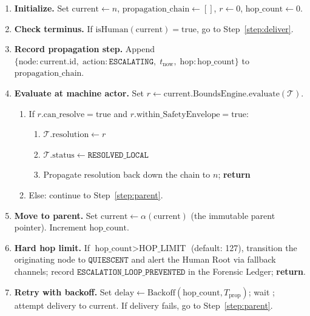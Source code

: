 \bigskip
\begin{algorithm}[H]
\caption{Bailout Protocol Escalation Algorithm (executed at every node)}
\label{alg:bailout-escalation}
\begin{enumerate}
\item \textbf{Initialize.} Set $\text{current} \leftarrow n$,
  $\text{propagation\_chain} \leftarrow []$, $r \leftarrow 0$,
  $\text{hop\_count} \leftarrow 0$.

\item \textbf{Check terminus.} If $\text{isHuman}(\text{current}) = \text{true}$,
  go to Step~\ref{step:deliver}.

\item \textbf{Record propagation step.} Append
  $\{\text{node}: \text{current.id},\; \text{action}: \texttt{ESCALATING},\;
  t_{\text{now}},\; \text{hop}: \text{hop\_count}\}$ to
  $\text{propagation\_chain}$.

\item \textbf{Evaluate at machine actor.} Set
  $r \leftarrow \text{current.BoundsEngine.evaluate}(\mathcal{T})$.
  \begin{enumerate}
  \item If $r.\text{can\_resolve} = \text{true}$ and
    $r.\text{within\_SafetyEnvelope} = \text{true}$:
    \begin{enumerate}
    \item $\mathcal{T}.\text{resolution} \leftarrow r$
    \item $\mathcal{T}.\text{status} \leftarrow \texttt{RESOLVED\_LOCAL}$
    \item Propagate resolution back down the chain to $n$; \textbf{return}
    \end{enumerate}
  \item Else: continue to Step~\ref{step:parent}.
  \end{enumerate}

\item \label{step:parent}\textbf{Move to parent.} Set $\text{current}
  \leftarrow \alpha(\text{current})$ (the immutable parent pointer).
  Increment $\text{hop\_count}$.

\item \textbf{Hard hop limit.} If $\text{hop\_count} > \text{HOP\_LIMIT}$
  (default: 127), transition the originating node to
  $\texttt{QUIESCENT}$ and alert the Human Root via fallback channels;
  record $\texttt{ESCALATION\_LOOP\_PREVENTED}$ in the Forensic Ledger;
  \textbf{return}.

\item \textbf{Retry with backoff.} Set $\text{delay} \leftarrow
  \text{Backoff}(\text{hop\_count}, T_{\text{prop}})$; wait ;
  attempt delivery to $\text{current}$. If delivery fails, go to
  Step~\ref{step:parent}.


\end{enumerate}
\end{algorithm}
